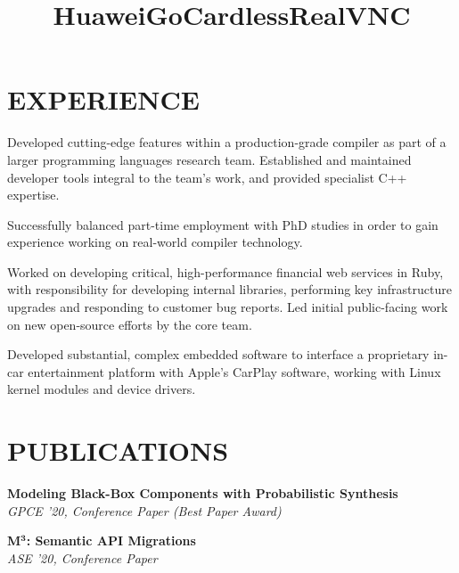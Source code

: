 \documentclass[margin]{res}
\begin{document}
\begin{resume}
\section{EXPERIENCE}

\dates{}
\title{\textbf{Huawei}}
\begin{position}
Developed cutting-edge features within a production-grade compiler as part of a
larger programming languages research team. Established and maintained developer
tools integral to the team's work, and provided specialist C++ expertise.

Successfully balanced part-time employment with PhD studies in order to gain
experience working on real-world compiler technology.
\end{position}

\dates{}
\title{\textbf{GoCardless}}
\begin{position}
Worked on developing critical, high-performance financial web services in Ruby, with
responsibility for developing internal libraries, performing key infrastructure
upgrades and responding to customer bug reports. Led initial public-facing work
on new open-source efforts by the core team.
\end{position}

\dates{}
\title{\textbf{RealVNC}}
\begin{position}
Developed substantial, complex embedded software to interface a proprietary
in-car entertainment platform with Apple's CarPlay software, working with Linux
kernel modules and device drivers.
\end{position}

\clearpage

\section{PUBLICATIONS}

\par
\textbf{Modeling Black-Box Components with Probabilistic Synthesis}\\
\emph{GPCE '20, Conference Paper (Best Paper Award)}

\par
\textbf{M$^\mathbf{3}$: Semantic API Migrations}\\
\emph{ASE '20, Conference Paper}


\end{resume}
\end{document}
